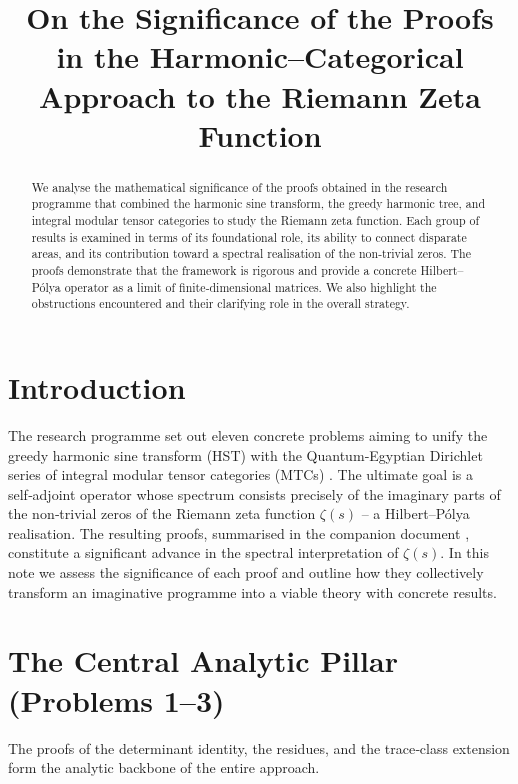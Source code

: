 \documentclass[11pt,a4paper]{article}
\title{\bfseries On the Significance of the Proofs in the Harmonic--Categorical Approach to the Riemann Zeta Function}
\author{}
\date{}
\theoremstyle{remark}
\begin{document}
\maketitle

\begin{abstract}
We analyse the mathematical significance of the proofs obtained in the research programme that combined the harmonic sine transform, the greedy harmonic tree, and integral modular tensor categories to study the Riemann zeta function. Each group of results is examined in terms of its foundational role, its ability to connect disparate areas, and its contribution toward a spectral realisation of the non‑trivial zeros. The proofs demonstrate that the framework is rigorous and provide a concrete Hilbert--Pólya operator as a limit of finite‑dimensional matrices. We also highlight the obstructions encountered and their clarifying role in the overall strategy.
\end{abstract}

\section{Introduction}
The research programme \cite{programme} set out eleven concrete problems aiming to unify the greedy harmonic sine transform (HST) \cite{Geere2026a,Geere2026b} with the Quantum‑Egyptian Dirichlet series of integral modular tensor categories (MTCs) \cite{Geere2026c}. The ultimate goal is a self‑adjoint operator whose spectrum consists precisely of the imaginary parts of the non‑trivial zeros of the Riemann zeta function $\zeta(s)$ -- a Hilbert--Pólya realisation. The resulting proofs, summarised in the companion document \cite{findings}, constitute a significant advance in the spectral interpretation of $\zeta(s)$. In this note we assess the significance of each proof and outline how they collectively transform an imaginative programme into a viable theory with concrete results.

\section{The Central Analytic Pillar (Problems 1--3)}
The proofs of the determinant identity, the residues, and the trace‑class extension form the analytic backbone of the entire approach.
\end{document}
